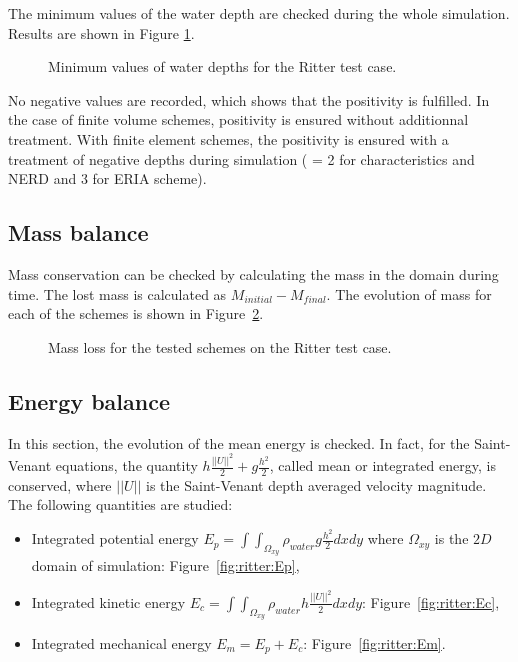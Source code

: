 The minimum values of the water depth are checked during the whole simulation.
Results are shown in Figure \ref{t2d:ritter:minmax}.

\begin{figure}[H]
\centering
{}
\caption{Minimum values of water depths for the Ritter test case.}
\label{t2d:ritter:minmax}
\end{figure}

No negative values are recorded, which shows that the positivity is fulfilled.
In the case of finite volume schemes, positivity is ensured without additionnal
treatment.
With finite element schemes, the positivity is ensured with a treatment of
negative depths during simulation ( = 2
for characteristics and NERD and 3 for ERIA scheme).

\subsection{Mass balance}

Mass conservation can be checked by calculating the mass in the domain during
time.
The lost mass is calculated as $M_{initial} - M_{final}$.
The evolution of mass for each of the schemes is shown in
Figure~\ref{fig:ritter:VoLTime}.

\begin{figure}[H]
\centering
  \caption{Mass loss for the tested schemes on the Ritter test case.}
\label{fig:ritter:VoLTime}
\end{figure}

\subsection{Energy balance}

In this section, the evolution of the mean energy is checked.
In fact, for the Saint-Venant equations, the quantity
$h \frac{||U||^2}{2} + g \frac{h^2}{2}$, called mean or integrated energy, is
conserved, where $||U||$ is the Saint-Venant depth averaged velocity magnitude.
The following quantities are studied:
\begin{itemize}
\item Integrated potential energy
  \textbf{$E_p =\int\int_{\Omega_{xy}}\rho_{water} g \frac{h^2}{2} dxdy$} where
  $\Omega_{xy}$ is the $2D$ domain of simulation: Figure~\ref{fig:ritter:Ep},
\item Integrated kinetic energy
  \textbf{$E_c =\int\int_{\Omega_{xy}} \rho_{water} h \frac{||U||^2}{2} dxdy$}:
  Figure~\ref{fig:ritter:Ec},
\item Integrated mechanical energy \textbf{$E_m = E_p + E_c$}:
  Figure~\ref{fig:ritter:Em}.
\end{itemize}

